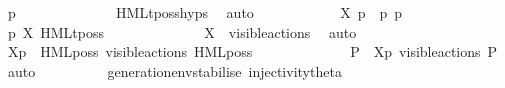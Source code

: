 \begin{isabellebody}
\ {\isacartoucheopen}p{\isacharprime}{\kern0pt}\ {\isasymTTurnstile}\ {\isasymphi}{\isacartoucheclose}\isanewline
\ \ \ \ \ \ \ \ \ \ \isamarkupfalse%
\ HMLt{\isacharunderscore}{\kern0pt}poss{\isachardot}{\kern0pt}hyps\ \isamarkupfalse%
\ auto\isanewline
\isanewline
\ \ \ \ \ \ \ \ \isamarkupfalse%
\ {\isacartoucheopen}{\isasymalpha}\ {\isasymin}\ X{\isacartoucheclose}\ {\isacartoucheopen}p\ {\isasymlongmapsto}{\isasymalpha}\ p{\isacharprime}{\kern0pt}{\isacartoucheclose}\ {\isacartoucheopen}p{\isacharprime}{\kern0pt}\ {\isasymTTurnstile}\ {\isasymphi}{\isacartoucheclose}\ \isamarkupfalse%
\ {\isacartoucheopen}p\ {\isasymTTurnstile}{\isacharbrackleft}{\kern0pt}X{\isacharbrackright}{\kern0pt}\ HMLt{\isacharunderscore}{\kern0pt}poss\ {\isasymalpha}\ {\isasymphi}{\isacartoucheclose}\isanewline
\ \ \ \ \ \ \ \ \ \ \isamarkupfalse%
\ {\isacartoucheopen}X\ {\isasymsubseteq}\ visible{\isacharunderscore}{\kern0pt}actions{\isacartoucheclose}\ \isamarkupfalse%
\ auto\isanewline
\ \ \ \ \ \ \isamarkupfalse%
\isanewline
\ \ \ \ \ \ \ \ \isamarkupfalse%
\ {\isacartoucheopen}{\isasymtheta}{\isacharbrackleft}{\kern0pt}X{\isacharbrackright}{\kern0pt}{\isacharparenleft}{\kern0pt}p{\isacharparenright}{\kern0pt}\ {\isasymTurnstile}\ HML{\isacharunderscore}{\kern0pt}poss\ {\isacharparenleft}{\kern0pt}{\isasymepsilon}{\isacharbrackleft}{\kern0pt}visible{\isacharunderscore}{\kern0pt}actions{\isacharbrackright}{\kern0pt}{\isacharparenright}{\kern0pt}\ {\isacharparenleft}{\kern0pt}HML{\isacharunderscore}{\kern0pt}poss\ {\isasymalpha}\ {\isasymsigma}{\isacharparenleft}{\kern0pt}{\isasymphi}{\isacharparenright}{\kern0pt}{\isacharparenright}{\kern0pt}{\isacartoucheclose}\isanewline
\ \ \ \ \ \ \ \ \isamarkupfalse%
\ \isamarkupfalse%
\ P{\isacharprime}{\kern0pt}\ \ {\isacartoucheopen}{\isasymtheta}{\isacharbrackleft}{\kern0pt}X{\isacharbrackright}{\kern0pt}{\isacharparenleft}{\kern0pt}p{\isacharparenright}{\kern0pt}\ {\isasymlongmapsto}\isactrlsup {\isasymtheta}{\isasymepsilon}{\isacharbrackleft}{\kern0pt}visible{\isacharunderscore}{\kern0pt}actions{\isacharbrackright}{\kern0pt}\ P{\isacharprime}{\kern0pt}{\isacartoucheclose}\ \isamarkupfalse%
\ auto\isanewline
\ \ \ \ \ \ \ \ \isamarkupfalse%
\ generation{\isacharunderscore}{\kern0pt}env{\isacharunderscore}{\kern0pt}stabilise\ injectivity{\isacharunderscore}{\kern0pt}theta{\isacharparenleft}{\kern0pt}{}{\isacharparenright}{\kern0pt}\ \isamarkupfalse%

\end{isabellebody}
